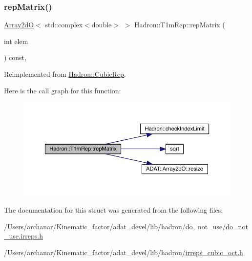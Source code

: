 \subsubsection{\texorpdfstring{repMatrix()}{repMatrix()}\hspace{0.1cm}{\footnotesize\ttfamily [2/2]}}
{\footnotesize\ttfamily \mbox{\hyperlink{classADAT_1_1Array2dO}{Array2dO}}$<$ std\+::complex$<$double$>$ $>$ Hadron\+::\+T1m\+Rep\+::rep\+Matrix (\begin{DoxyParamCaption}\item[{int}]{elem }\end{DoxyParamCaption}) const\hspace{0.3cm}{\ttfamily [inline]}, {\ttfamily [virtual]}}



Reimplemented from \mbox{\hyperlink{structHadron_1_1CubicRep_ac5d7e9e6f4ab1158b5fce3e4ad9e8005}{Hadron\+::\+Cubic\+Rep}}.

Here is the call graph for this function\+:
\nopagebreak
\begin{figure}[H]
\begin{center}
\leavevmode
\includegraphics[width=350pt]{de/dd9/structHadron_1_1T1mRep_a77a8ee94e1ed9406845c8d1106f73599_cgraph}
\end{center}
\end{figure}


The documentation for this struct was generated from the following files\+:\begin{DoxyCompactItemize}
\item 
/\+Users/archanar/\+Kinematic\+\_\+factor/adat\+\_\+devel/lib/hadron/do\+\_\+not\+\_\+use/\mbox{\hyperlink{do__not__use_8irreps_8h}{do\+\_\+not\+\_\+use.\+irreps.\+h}}\item 
/\+Users/archanar/\+Kinematic\+\_\+factor/adat\+\_\+devel/lib/hadron/\mbox{\hyperlink{lib_2hadron_2irreps__cubic__oct_8h}{irreps\+\_\+cubic\+\_\+oct.\+h}}\end{DoxyCompactItemize}
